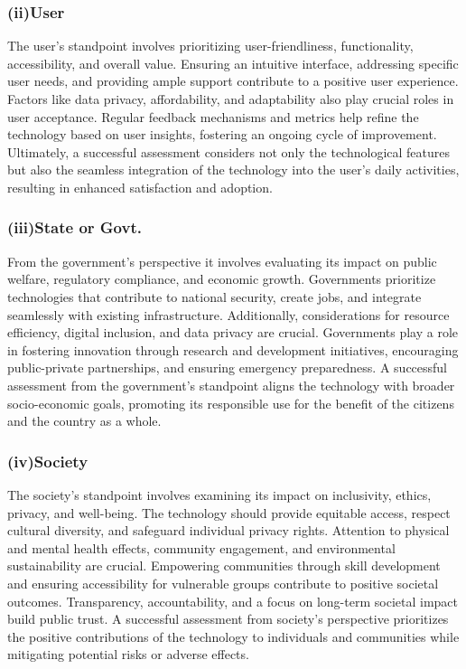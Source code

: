 \documentclass{report}
\begin{document}
\subsubsection*{\textbf{(ii)User}}
The user's standpoint involves prioritizing user-friendliness, functionality, 
accessibility, and overall value. Ensuring an intuitive interface, addressing specific user needs, and providing 
ample support contribute to a positive user experience. Factors like data privacy, affordability, and adaptability 
also play crucial roles in user acceptance. Regular feedback mechanisms and metrics help refine the technology 
based on user insights, fostering an ongoing cycle of improvement. Ultimately, a successful assessment considers 
not only the technological features but also the seamless integration of the technology into the user's daily 
activities, resulting in enhanced satisfaction and adoption.


\subsubsection*{\textbf{(iii)State or Govt.}}
From the government's perspective it involves evaluating its impact on public welfare, 
regulatory compliance, and economic growth. Governments prioritize technologies that contribute to national 
security, create jobs, and integrate seamlessly with existing infrastructure. Additionally, considerations 
for resource efficiency, digital inclusion, and data privacy are crucial. Governments play a role in fostering 
innovation through research and development initiatives, encouraging public-private partnerships, 
and ensuring emergency preparedness. A successful assessment from the government's standpoint aligns 
the technology with broader socio-economic goals, promoting its responsible use for the benefit of the 
citizens and the country as a whole.

\subsubsection*{\textbf{(iv)Society}}
The society's standpoint involves examining its impact on inclusivity, ethics, privacy, and well-being. 
The technology should provide equitable access, respect cultural diversity, and safeguard individual privacy rights. 
Attention to physical and mental health effects, community engagement, and environmental sustainability are crucial. 
Empowering communities through skill development and ensuring accessibility for vulnerable groups contribute to positive 
societal outcomes. Transparency, accountability, and a focus on long-term societal impact build public trust. 
A successful assessment from society's perspective prioritizes the positive contributions of the technology to 
individuals and communities while mitigating potential risks or adverse effects.
\end{document}
